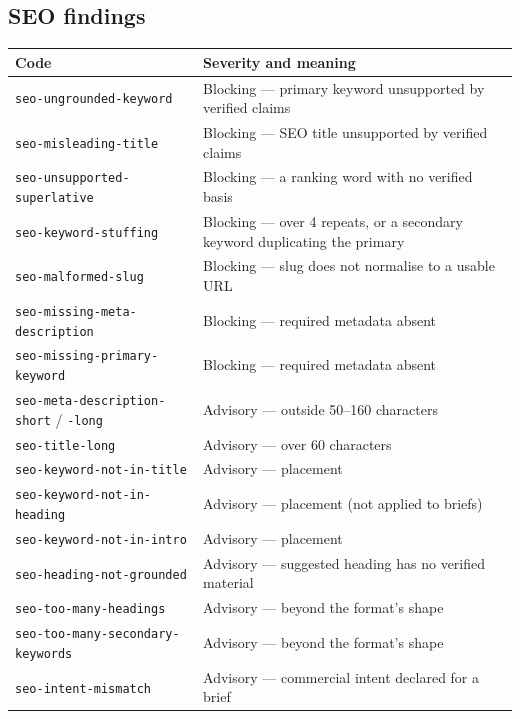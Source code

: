 \documentclass[11pt,a4paper]{article}
\newcommand{\brk}{\hyphenpenalty=0\exhyphenpenalty=0\relax}
\newcommand{\code}[1]{\texttt{\small\brk #1}}
\begin{document}
\subsection{SEO findings}

\begin{center}
\footnotesize
\begin{tabularx}{\textwidth}{@{}>{\RaggedRight}p{5.6cm} >{\RaggedRight}X@{}}
\toprule
\textbf{Code} & \textbf{Severity and meaning} \\
\midrule
\code{seo-ungrounded-keyword} & \textcolor{aitkStop}{Blocking} --- primary keyword unsupported by verified claims \\
\code{seo-misleading-title} & \textcolor{aitkStop}{Blocking} --- SEO title unsupported by verified claims \\
\code{seo-unsupported-superlative} & \textcolor{aitkStop}{Blocking} --- a ranking word with no verified basis \\
\code{seo-keyword-stuffing} & \textcolor{aitkStop}{Blocking} --- over 4 repeats, or a secondary keyword duplicating the primary \\
\code{seo-malformed-slug} & \textcolor{aitkStop}{Blocking} --- slug does not normalise to a usable URL \\
\code{seo-missing-meta-description} & \textcolor{aitkStop}{Blocking} --- required metadata absent \\
\code{seo-missing-primary-keyword} & \textcolor{aitkStop}{Blocking} --- required metadata absent \\
\code{seo-meta-description-short} / \code{-long} & \textcolor{aitkHold}{Advisory} --- outside 50--160 characters \\
\code{seo-title-long} & \textcolor{aitkHold}{Advisory} --- over 60 characters \\
\code{seo-keyword-not-in-title} & \textcolor{aitkHold}{Advisory} --- placement \\
\code{seo-keyword-not-in-heading} & \textcolor{aitkHold}{Advisory} --- placement (not applied to briefs) \\
\code{seo-keyword-not-in-intro} & \textcolor{aitkHold}{Advisory} --- placement \\
\code{seo-heading-not-grounded} & \textcolor{aitkHold}{Advisory} --- suggested heading has no verified material \\
\code{seo-too-many-headings} & \textcolor{aitkHold}{Advisory} --- beyond the format's shape \\
\code{seo-too-many-}\allowbreak\code{secondary-keywords} & \textcolor{aitkHold}{Advisory} --- beyond the format's shape \\
\code{seo-intent-mismatch} & \textcolor{aitkHold}{Advisory} --- commercial intent declared for a brief \\
\bottomrule
\end{tabularx}
\end{center}
\end{document}
